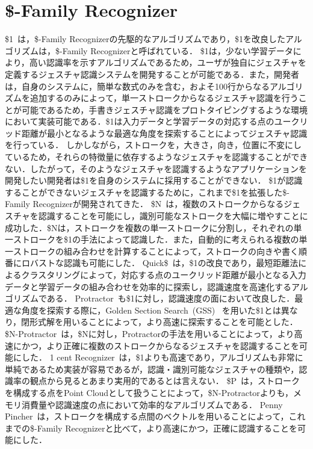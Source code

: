 \section{\$-Family Recognizer}
\$1~\cite{Wobbrock:2007:GWL:1294211.1294238}は，\$-Family Recognizerの先駆的なアルゴリズムであり，\$1を改良したアルゴリズムは，\$-Family Recognizerと呼ばれている．
\$1は，少ない学習データにより，高い認識率を示すアルゴリズムであるため，ユーザが独自にジェスチャを定義するジェスチャ認識システムを開発することが可能である．また，開発者は，自身のシステムに，簡単な数式のみを含む，およそ100行からなるアルゴリズムを追加するのみによって，単一ストロークからなるジェスチャ認識を行うことが可能であるため，手書きジェスチャ認識をプロトタイピングするような環境において実装可能である．\$1は入力データと学習データの対応する点のユークリッド距離が最小となるような最適な角度を探索することによってジェスチャ認識を行っている．
しかしながら，ストロークを，大きさ，向き，位置に不変にしているため，それらの特徴量に依存するようなジェスチャを認識することができない．したがって，そのようなジェスチャを認識するようなアプリケーションを開発したい開発者は\$1を自身のシステムに採用することができない．
\$1が認識することができないジェスチャを認識するために，これまで\$1を拡張した\$-Family Recognizerが開発されてきた．
\$N~\cite{Anthony:2010:LMR:1839214.1839258}は，複数のストロークからなるジェスチャを認識することを可能にし，識別可能なストロークを大幅に増やすことに成功した．\$Nは，ストロークを複数の単一ストロークに分割し，それぞれの単一ストロークを\$1の手法によって認識した．また，自動的に考えられる複数の単一ストロークの組み合わせを計算することによって，ストロークの向きや書く順番にロバストな認識も可能にした．
Quick\$~\cite{Reaver:2011:MQU:2021164.2021183}は，\$1の改良であり，最短距離法によるクラスタリングによって，対応する点のユークリッド距離が最小となる入力データと学習データの組み合わせを効率的に探索し，認識速度を高速化するアルゴリズムである．
Protractor~\cite{Li:2010:PFA:1753326.1753654}も\$1に対し，認識速度の面において改良した．最適な角度を探索する際に，Golden Section Search~(GSS)~\cite{Press:1992:NRC:148286}%
を用いた\$1とは異なり，閉形式解を用いることによって，より高速に探索することを可能とした．
\$N-Protractor~\cite{Anthony:2012:NFA:2305276.2305296}は，\$Nに対し，Protractorの手法を用いることによって，より高速にかつ，より正確に複数のストロークからなるジェスチャを認識することを可能にした．
1 cent Recognizer~\cite{Herold:2012:CRF:2331067.2331074}は，\$1よりも高速であり，アルゴリズムも非常に単純であるため実装が容易であるが，認識・識別可能なジェスチャの種類や，認識率の観点から見るとあまり実用的であるとは言えない．
\$P~\cite{Vatavu:2012:GPC:2388676.2388732}は，ストロークを構成する点をPoint Cloudとして扱うことによって，\$N-Protractorよりも，メモリ消費量や認識速度の点において効率的なアルゴリズムである．
Penny Pincher~\cite{Taranta:2015:PPB:2788890.2788925}は，ストロークを構成する点間のベクトルを用いることによって，これまでの\$-Family Recognizerと比べて，より高速にかつ，正確に認識することを可能にした．

